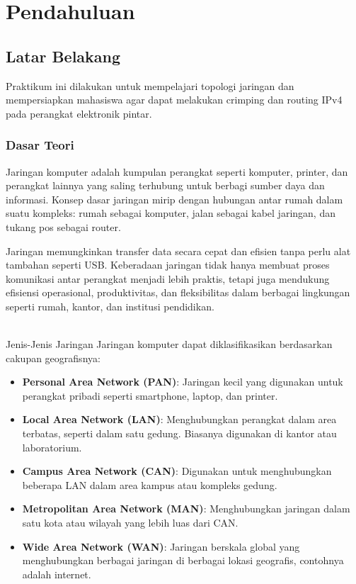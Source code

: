 \section{Pendahuluan}
\subsection{Latar Belakang}
Praktikum ini dilakukan untuk mempelajari topologi jaringan dan mempersiapkan mahasiswa agar dapat melakukan crimping dan routing IPv4 pada perangkat elektronik pintar.

\subsubsection{Dasar Teori}

Jaringan komputer adalah kumpulan perangkat seperti komputer, printer, dan perangkat lainnya yang saling terhubung untuk berbagi sumber daya dan informasi. Konsep dasar jaringan mirip dengan hubungan antar rumah dalam suatu kompleks: rumah sebagai komputer, jalan sebagai kabel jaringan, dan tukang pos sebagai router.

Jaringan memungkinkan transfer data secara cepat dan efisien tanpa perlu alat tambahan seperti USB. Keberadaan jaringan tidak hanya membuat proses komunikasi antar perangkat menjadi lebih praktis, tetapi juga mendukung efisiensi operasional, produktivitas, dan fleksibilitas dalam berbagai lingkungan seperti rumah, kantor, dan institusi pendidikan.

\\{Jenis-Jenis Jaringan}
Jaringan komputer dapat diklasifikasikan berdasarkan cakupan geografisnya:
\begin{itemize}
    \item \textbf{Personal Area Network (PAN)}: Jaringan kecil yang digunakan untuk perangkat pribadi seperti smartphone, laptop, dan printer.
    \item \textbf{Local Area Network (LAN)}: Menghubungkan perangkat dalam area terbatas, seperti dalam satu gedung. Biasanya digunakan di kantor atau laboratorium.
    \item \textbf{Campus Area Network (CAN)}: Digunakan untuk menghubungkan beberapa LAN dalam area kampus atau kompleks gedung.
    \item \textbf{Metropolitan Area Network (MAN)}: Menghubungkan jaringan dalam satu kota atau wilayah yang lebih luas dari CAN.
    \item \textbf{Wide Area Network (WAN)}: Jaringan berskala global yang menghubungkan berbagai jaringan di berbagai lokasi geografis, contohnya adalah internet.
\end{itemize}


